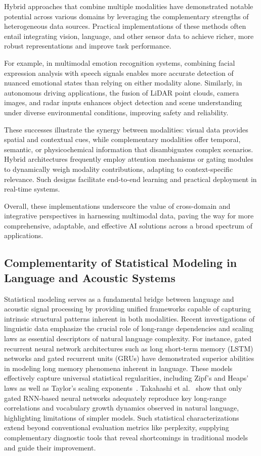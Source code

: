 \documentclass[sigconf]{acmart}
\begin{document}
Hybrid approaches that combine multiple modalities have demonstrated notable potential across various domains by leveraging the complementary strengths of heterogeneous data sources. Practical implementations of these methods often entail integrating vision, language, and other sensor data to achieve richer, more robust representations and improve task performance.

For example, in multimodal emotion recognition systems, combining facial expression analysis with speech signals enables more accurate detection of nuanced emotional states than relying on either modality alone. Similarly, in autonomous driving applications, the fusion of LiDAR point clouds, camera images, and radar inputs enhances object detection and scene understanding under diverse environmental conditions, improving safety and reliability.

These successes illustrate the synergy between modalities: visual data provides spatial and contextual cues, while complementary modalities offer temporal, semantic, or physicochemical information that disambiguates complex scenarios. Hybrid architectures frequently employ attention mechanisms or gating modules to dynamically weigh modality contributions, adapting to context-specific relevance. Such designs facilitate end-to-end learning and practical deployment in real-time systems.

Overall, these implementations underscore the value of cross-domain and integrative perspectives in harnessing multimodal data, paving the way for more comprehensive, adaptable, and effective AI solutions across a broad spectrum of applications.

\subsection{Complementarity of Statistical Modeling in Language and Acoustic Systems}

Statistical modeling serves as a fundamental bridge between language and acoustic signal processing by providing unified frameworks capable of capturing intrinsic structural patterns inherent in both modalities. Recent investigations of linguistic data emphasize the crucial role of long-range dependencies and scaling laws as essential descriptors of natural language complexity. For instance, gated recurrent neural network architectures such as long short-term memory (LSTM) networks and gated recurrent units (GRUs) have demonstrated superior abilities in modeling long memory phenomena inherent in language. These models effectively capture universal statistical regularities, including Zipf’s and Heaps’ laws as well as Taylor’s scaling exponents~\cite{ref51}. Takahashi et al.~\cite{ref51} show that only gated RNN-based neural networks adequately reproduce key long-range correlations and vocabulary growth dynamics observed in natural language, highlighting limitations of simpler models. Such statistical characterizations extend beyond conventional evaluation metrics like perplexity, supplying complementary diagnostic tools that reveal shortcomings in traditional models and guide their improvement.
\end{document}

